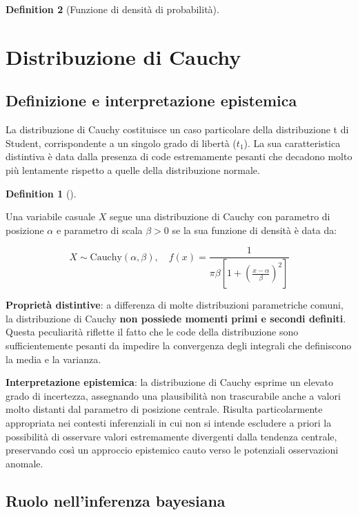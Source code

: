 \documentclass[
  letterpaper,
  DIV=11,
  numbers=noendperiod,
  oneside]{scrreprt}
\theoremstyle{definition}
\theoremstyle{plain}
\theoremstyle{definition}
\newtheorem{definition}{Definition}[chapter]
\theoremstyle{remark}
\begin{document}
\begin{definition}[Funzione di densità di
probabilità]
\section{Distribuzione di Cauchy}\label{distribuzione-di-cauchy}

\subsection{Definizione e interpretazione
epistemica}\label{definizione-e-interpretazione-epistemica-11}

La distribuzione di Cauchy costituisce un caso particolare della
distribuzione t di Student, corrispondente a un singolo grado di libertà
(\(t_1\)). La sua caratteristica distintiva è data dalla presenza di
code estremamente pesanti che decadono molto più lentamente rispetto a
quelle della distribuzione normale.

\begin{definition}[]\protect\hypertarget{def-cauchy}{}\label{def-cauchy}

Una variabile casuale \(X\) segue una distribuzione di Cauchy con
parametro di posizione \(\alpha\) e parametro di scala \(\beta > 0\) se
la sua funzione di densità è data da:

\[
X \sim \text{Cauchy}(\alpha, \beta), \quad f(x) = \frac{1}{\pi\beta\left[1 + \left(\frac{x-\alpha}{\beta}\right)^2\right]}
\]

\textbf{Proprietà distintive}: a differenza di molte distribuzioni
parametriche comuni, la distribuzione di Cauchy \textbf{non possiede
momenti primi e secondi definiti}. Questa peculiarità riflette il fatto
che le code della distribuzione sono sufficientemente pesanti da
impedire la convergenza degli integrali che definiscono la media e la
varianza.

\end{definition}

\textbf{Interpretazione epistemica}: la distribuzione di Cauchy esprime
un elevato grado di incertezza, assegnando una plausibilità non
trascurabile anche a valori molto distanti dal parametro di posizione
centrale. Risulta particolarmente appropriata nei contesti inferenziali
in cui non si intende escludere a priori la possibilità di osservare
valori estremamente divergenti dalla tendenza centrale, preservando così
un approccio epistemico cauto verso le potenziali osservazioni anomale.

\subsection{Ruolo nell'inferenza
bayesiana}\label{ruolo-nellinferenza-bayesiana-11}


\end{definition}
\end{document}
